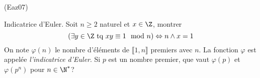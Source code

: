 \begin{tiny}(Eaz07)\end{tiny} \label{indicEuler} Indicatrice d'Euler.\newline
Soit $n\geq 2$ naturel et $x\in \Z$, montrer 
\begin{displaymath}
  \left( \exists y \in \Z \text{ tq } xy \equiv 1 \mod n\right)  
  \Leftrightarrow n\wedge x = 1
\end{displaymath}
On note $\varphi (n)$ le nombre d'éléments de $\llbracket 1,n \rrbracket$ premiers avec $n$. La fonction $\varphi $ est appel{\'e}e \emph{l'indicatrice d'Euler}.
Si $p$ est un nombre premier, que vaut $\varphi(p)$ et $\varphi(p^n)$ pour $n\in \N^*$?

